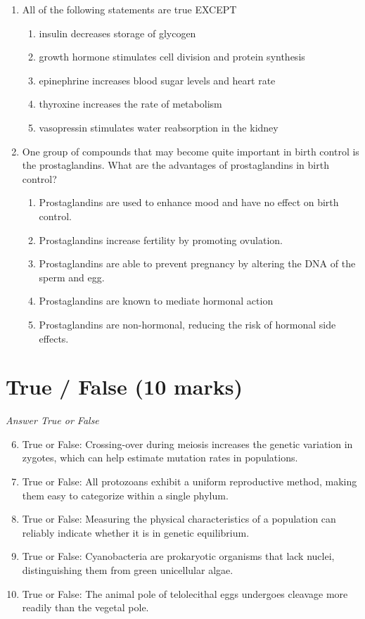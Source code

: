 \documentclass[12pt]{article}
\begin{document}
\begin{enumerate}[label=\arabic*.]
\item All of the following statements are true EXCEPT
\begin{enumerate}[label=(\alph*)]
    \item insulin decreases storage of glycogen
    \item growth hormone stimulates cell division and protein synthesis
    \item epinephrine increases blood sugar levels and heart rate
    \item thyroxine increases the rate of metabolism
    \item vasopressin stimulates water reabsorption in the kidney
\end{enumerate}
\item One group of compounds that may become quite important in birth control is the prostaglandins. What are the advantages of prostaglandins in birth control?
\begin{enumerate}[label=(\alph*)]
    \item Prostaglandins are used to enhance mood and have no effect on birth control.
    \item Prostaglandins increase fertility by promoting ovulation.
    \item Prostaglandins are able to prevent pregnancy by altering the DNA of the sperm and egg.
    \item Prostaglandins are known to mediate hormonal action
    \item Prostaglandins are non-hormonal, reducing the risk of hormonal side effects.
\end{enumerate}
\end{enumerate}

\section*{True / False (10 marks)}
\textit{Answer True or False}
\begin{enumerate}[label=\arabic*.]
\setcounter{enumi}{5}
\item True or False: Crossing-over during meiosis increases the genetic variation in zygotes, which can help estimate mutation rates in populations.
\item True or False: All protozoans exhibit a uniform reproductive method, making them easy to categorize within a single phylum.
\item True or False: Measuring the physical characteristics of a population can reliably indicate whether it is in genetic equilibrium.
\item True or False: Cyanobacteria are prokaryotic organisms that lack nuclei, distinguishing them from green unicellular algae.
\item True or False: The animal pole of telolecithal eggs undergoes cleavage more readily than the vegetal pole.
\end{enumerate}
\end{document}
